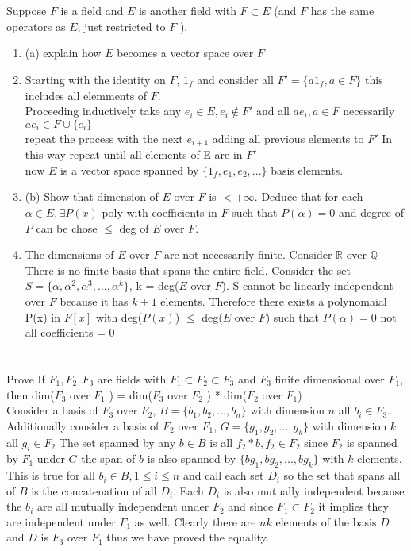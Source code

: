 \documentclass{article}
\begin{document}
    \section{}
    Suppose $F$ is a field and $E$ is another field with $F \subset E$ (and $F$ has the same operators as $E$, just restricted to $F$ ).
    \begin{enumerate}
        \item (a) explain how $E$ becomes a vector space over $F$ 
        \item 
            Starting with the identity on $F$, $1_f$ and consider all $F' = \{a 1_f, a \in F\}$  this includes all elemments of $F$.\\
            Proceeding inductively take any $e_i \in E, e_i \notin F'$ and all  $ae_i, a \in F$  necessarily  $ae_i \in F \cup \{e_i\}$ 
            \\ repeat the process with the next $e_{i+1}$ adding  all previous elements to $F'$ In this way repeat until all elements of E are in  $F'$\\
        now  $E$ is a vector space spanned by $\{1_f, e_1, e_2, ...\}$ basis elements.
        \item (b) Show that dimension of $E$ over $F$ is $< + \infty$. Deduce that for each $\alpha \in E, \exists P(x)$ poly with
            coefficients in $F$ such that $P(\alpha) = 0$ and degree of $P$ can be chose $\le$ deg of $E$ over $F$.
        \item The dimensions of $E$ over $F$ are not necessarily finite. Consider $ \mathbb{R}$ over $ \mathbb{Q}$ There is no finite basis that spans the entire field.
            Consider the set $S =\{\alpha, \alpha^2, \alpha^{3}, ..., \alpha^{k}\}$, k = deg($E$ over $F$). S cannot be linearly independent over $F$ because it has $k+1$ elements. Therefore
            there exists a polynomaial P(x) in $F[x]$ with deg($P(x)$)  $\le $ deg($E$ over $F$) such that $P(\alpha) = 0$ not all coefficients = 0
    \end{enumerate}
    \section{}
    Prove If $F_1,F_2,F_3$ are fields with $F_1 \subset F_2 \subset F_3$ and $F_3$ finite dimensional
    over $F_1$, then dim($F_3$ over $F_1$ ) = dim($F_3$ over $F_2$ ) * dim($F_2$ over $F_1$)\\
    Consider a basis of  $F_3$ over $F_2$, $B = \{b_1,b_2,...,b_n\}$ with dimension $n$ all  $b_i \in F_3$. Additionally
    consider a basis of $F_2$ over $F_1$, $G = \{g_1, g_2,...,g_k\}$ with dimension $k$ all $g_i \in F_2$ 
    The set spanned by any $b \in B$ is all $f_2 * b, f_2\in F_2$ since $F_2$ is spanned by $F_1$ under $G$ the span of $b$ is also spanned
    by  $\{bg_1,bg_2,...,bg_k\}$ with $k$ elements. This is true for all $b_i \in B, 1 \le i \le n$ and call each set $D_i$ so the set that spans all of  $B$ is the concatenation  of all $D_i$.
    Each $D_i$ is also mutually independent because the $b_i$ are all mutually independent under $F_2$ and since $F_1 \subset F_2$ it implies they are independent under $F_1$ as well. Clearly there are $nk$ elements of the basis
    $D$ and $D$ is $F_3$ over $F_1$ thus we have proved the equality.
\end{document}
